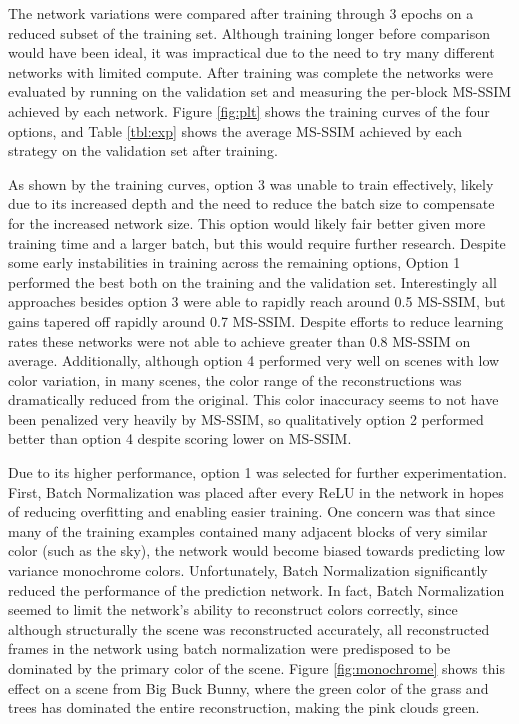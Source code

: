 \documentclass[10pt,twocolumn,letterpaper]{article}
\begin{document}
The network variations were compared after training through 3 epochs on a reduced subset of the training set. Although training longer before comparison would have been ideal, it was impractical due to the need to try many different networks with limited compute. After training was complete the networks were evaluated by running on the validation set and measuring the per-block MS-SSIM achieved by each network. Figure \ref{fig:plt} shows the training curves of the four options, and Table \ref{tbl:exp} shows the average MS-SSIM achieved by each strategy on the validation set after training.

As shown by the training curves, option 3 was unable to train effectively, likely due to its increased depth and the need to reduce the batch size to compensate for the increased network size. This option would likely fair better given more training time and a larger batch, but this would require further research. Despite some early instabilities in training across the remaining options, Option 1 performed the best both on the training and the validation set. Interestingly all approaches besides option 3 were able to rapidly reach around 0.5 MS-SSIM, but gains tapered off rapidly around 0.7 MS-SSIM. Despite efforts to reduce learning rates these networks were not able to achieve greater than 0.8 MS-SSIM on average. Additionally, although option 4 performed very well on scenes with low color variation, in many scenes, the color range of the reconstructions was dramatically reduced from the original. This color inaccuracy seems to not have been penalized very heavily by MS-SSIM, so qualitatively option 2 performed better than option 4 despite scoring lower on MS-SSIM.

Due to its higher performance, option 1 was selected for further experimentation. First, Batch Normalization was placed after every ReLU in the network in hopes of reducing overfitting and enabling easier training. One concern was that since many of the training examples contained many adjacent blocks of very similar color (such as the sky), the network would become biased towards predicting low variance monochrome colors. Unfortunately, Batch Normalization significantly reduced the performance of the prediction network. In fact, Batch Normalization seemed to limit the network's ability to reconstruct colors correctly, since although structurally the scene was reconstructed accurately, all reconstructed frames in the network using batch normalization were predisposed to be dominated by the primary color of the scene. Figure \ref{fig:monochrome} shows this effect on a scene from Big Buck Bunny, where the green color of the grass and trees has dominated the entire reconstruction, making the pink clouds green.
\end{document}
